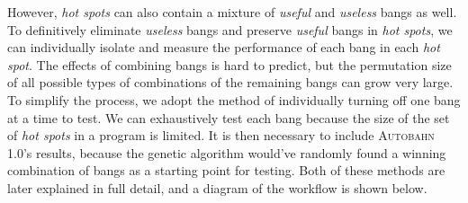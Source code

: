 \documentclass[format=sigplan]{acmart}
\newcommand{\hotspot}[0]{\textit{hot spot}}
\newcommand{\hotspots}[0]{\textit{hot spots}}
\newcommand{\useful}[0]{\textit{useful}}
\newcommand{\useless}[0]{\textit{useless}}
\newcommand{\Ao}[0]{\textsc{Autobahn 1.0}}
\begin{document}
However, \hotspots{} can also contain a mixture of \useful{} and \useless{} bangs as well. To definitively eliminate \useless{} bangs and preserve \useful{} bangs in \hotspots{}, we can individually isolate and measure the performance of each bang in each \hotspot{}. The effects of combining bangs is hard to predict, but the permutation size of all possible types of combinations of the remaining bangs can grow very large. To simplify the process, we adopt the method of individually turning off one bang at a time to test. We can exhaustively test each bang because the size of the set of \hotspots{} in a program is limited. It is then necessary to include \Ao{}'s results, because the genetic algorithm would've randomly found a winning combination of bangs as a starting point for testing. Both of these methods are later explained in full detail, and a diagram of the workflow is shown below.

\end{document}
